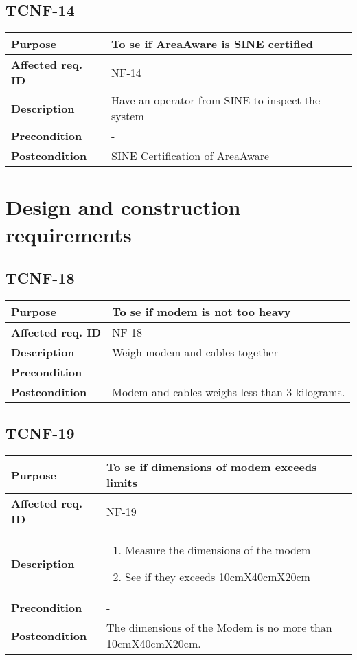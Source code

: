 \subsection{TCNF-14}
\begin{tabular}{ l | m{11cm}}
	\textbf{Purpose}			& To se if AreaAware is SINE certified  \\ \hline
	\textbf{Affected req. ID}	& NF-14 \\ \hline
	\textbf{Description}		& Have an operator from SINE to inspect the system \\
	\hline
	\textbf{Precondition}		& -\\ \hline
	\textbf{Postcondition}		& SINE Certification of AreaAware\\
\end{tabular}

\section{Design and construction requirements}
\subsection{TCNF-18}
\begin{tabular}{ l | m{11cm}}
	\textbf{Purpose}			& To se if modem is not too heavy  \\ \hline
	\textbf{Affected req. ID}	& NF-18 \\ \hline
	\textbf{Description}		& Weigh modem and cables together \\
	\hline
	\textbf{Precondition}		& -\\ \hline
	\textbf{Postcondition}		& Modem and cables weighs less than 3 kilograms.\\
\end{tabular}

\subsection{TCNF-19}
\begin{tabular}{ l | m{11cm}}
	\textbf{Purpose}			& To se if dimensions of modem exceeds limits   \\ \hline
	\textbf{Affected req. ID}	& NF-19 \\ \hline
	\textbf{Description}		& \begin{enumerate}
		\item Measure the dimensions of the modem \item See if they exceeds 10cmX40cmX20cm
	\end{enumerate} \\
	\hline
	\textbf{Precondition}		& -\\ \hline
	\textbf{Postcondition}		& The dimensions of the Modem is no more than 10cmX40cmX20cm.\\
\end{tabular}

